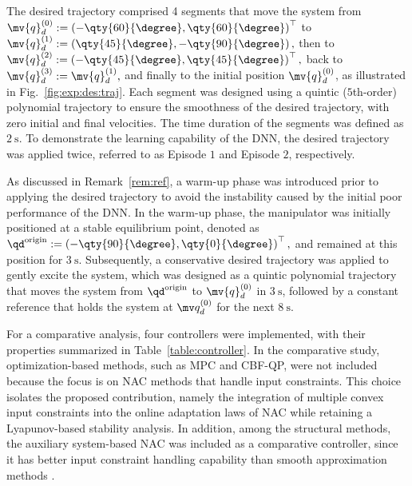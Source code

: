 \documentclass[letterpaper, journal, twoside]{IEEEtran}
\begin{document}
The desired trajectory comprised 4 segments that move the system from 
$
  \mv{q}_d^{(0)}
  :=
  \left(
    -\qty{60}{\degree}
    ,
    \qty{60}{\degree}
  \right)^\top    
$
to 
$
  \mv{q}_d^{(1)}
  :=
  \left(
    \qty{45}{\degree}
    ,
    -\qty{90}{\degree}
  \right)
  ,
$ 
then to 
$
  \mv{q}_d^{(2)}
  :=
  \left(
    -\qty{45}{\degree}
    ,
    \qty{45}{\degree}
  \right)^\top
  ,
$
back to
$
  \mv{q}_d^{(3)}
  :=
  \mv{q}_d^{(1)}
  ,
$
and finally to the initial position $\mv{q}_d^{(0)}$, as illustrated in Fig.~\ref{fig:exp:des:traj}.
Each segment was designed using a quintic ($5$th-order) polynomial trajectory to ensure the smoothness of the desired trajectory, with zero initial and final velocities.
The time duration of the segments was defined as $\qty{2}{\second}$.
To demonstrate the learning capability of the DNN, the desired trajectory was applied twice, referred to as Episode $1$ and Episode $2$, respectively.

As discussed in Remark~\ref{rem:ref}, a warm-up phase was introduced prior to applying the desired trajectory to avoid the instability caused by the initial poor performance of the DNN.
In the warm-up phase, the manipulator was initially positioned at a stable equilibrium point, denoted as 
$
    {\qd}^{\rm{origin}} 
    := 
    \left(
        -\qty{90}{\degree}
        , 
        \qty{0}{\degree}
    \right)^\top
    ,
$
and remained at this position for $\qty{3}{\second}$.
Subsequently, a conservative desired trajectory was applied to gently excite the system, which was designed as a quintic polynomial trajectory that moves the system from ${\qd}^{\rm{origin}}$ to $\mv{q}_d^{(0)}$ in $\qty{3}{\second}$, followed by a constant reference that holds the system at $\mv q_d^{(0)}$ for the next $\qty{8}{\second}$.

\hfill



For a comparative analysis, four controllers were implemented, with their properties summarized in Table~\ref{table:controller}.
In the comparative study, optimization-based methods, such as MPC and CBF-QP, were not included because the focus is on NAC methods that handle input constraints.
This choice isolates the proposed contribution, namely the integration of multiple convex input constraints into the online adaptation laws of NAC while retaining a Lyapunov-based stability analysis.
In addition, among the structural methods, the auxiliary system-based NAC was included as a comparative controller, since it has better input constraint handling capability than smooth approximation methods \cite{Min:2021aa}.
\end{document}
